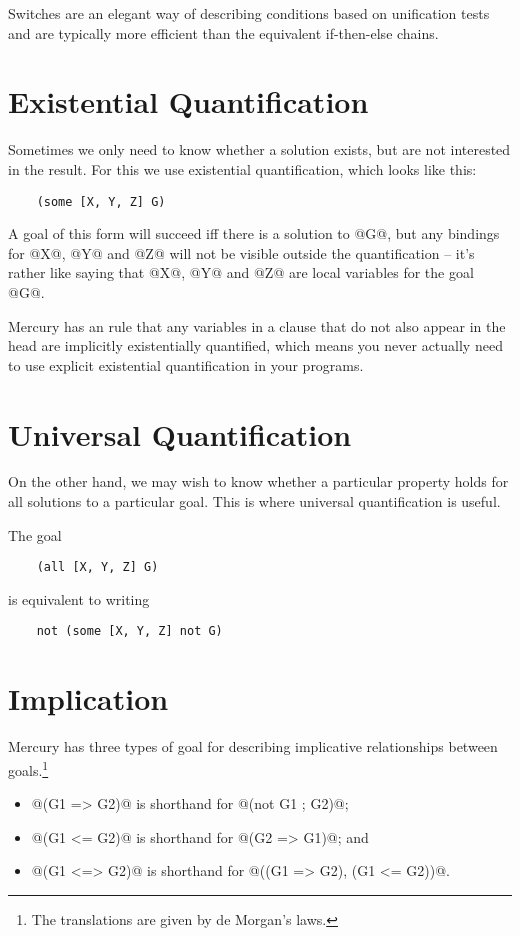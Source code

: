 Switches are an elegant way of describing conditions based on
unification tests and are typically more efficient than the
equivalent if-then-else chains.

\section{Existential Quantification}

Sometimes we only need to know whether a solution exists, but
are not interested in the result.  For this we use existential
quantification, which looks like this:
\begin{verbatim}
    (some [X, Y, Z] G)
\end{verbatim}
A goal of this form will succeed iff there is a solution to @G@,
but any bindings for @X@, @Y@ and @Z@ will not be visible outside
the quantification -- it's rather like saying that @X@, @Y@ and @Z@ 
are local variables for the goal @G@.

Mercury has an rule that any variables in a clause that do not
also appear in the head are implicitly existentially
quantified, which means you never actually need to use
explicit existential quantification in your programs.

\section{Universal Quantification}

On the other hand, we may wish to know whether a particular
property holds for all solutions to a particular goal.  This
is where universal quantification is useful.

The goal
\begin{verbatim}
    (all [X, Y, Z] G)
\end{verbatim}
is equivalent to writing
\begin{verbatim}
    not (some [X, Y, Z] not G)
\end{verbatim}

\section{Implication}

Mercury has three types of goal for describing implicative
relationships between goals.\footnote{The translations are given by de Morgan's laws.}
\begin{itemize}
\item @(G1 => G2)@ is shorthand for @(not G1 ; G2)@;
\item @(G1 <= G2)@ is shorthand for @(G2 => G1)@; and
\item @(G1 <=> G2)@ is shorthand for @((G1 => G2), (G1 <= G2))@.
\end{itemize}

